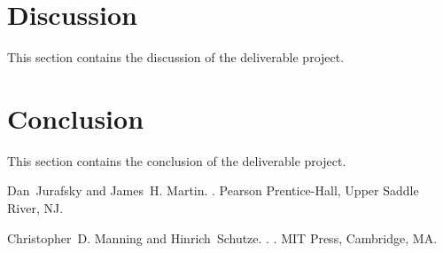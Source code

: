 \documentclass[11pt]{article}
\begin{document}
\section{Discussion}

This section contains the discussion of the deliverable project.

\section{Conclusion}

This section contains the conclusion of the deliverable project.

\begin{thebibliography}{}

Dan~Jurafsky and James~H. Martin.
.
\newblock Pearson Prentice-{Hall}, Upper Saddle River, NJ.

{Christopher~D. Manning and Hinrich~Schutze}.
.
.
\newblock MIT Press, Cambridge, MA.

\end{thebibliography}
\end{document}
